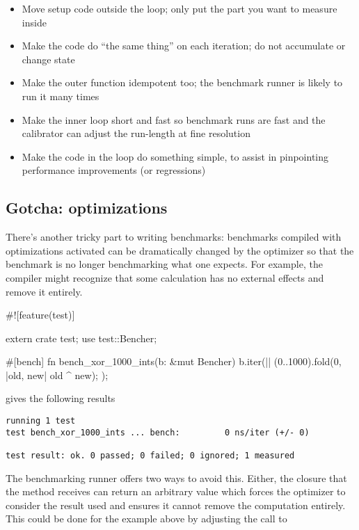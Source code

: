 \begin{itemize}
  \item{Move setup code outside the  loop; only put the part you want to measure inside}
  \item{Make the code do \enquote{the same thing} on each iteration; do not accumulate or change state}
  \item{Make the outer function idempotent too; the benchmark runner is likely to run it many times}
  \item{Make the inner  loop short and fast so benchmark runs are fast and the calibrator can adjust the 
      run-length at fine resolution}
  \item{Make the code in the  loop do something simple, to assist in pinpointing performance improvements 
      (or regressions)}
\end{itemize}

\subsection*{Gotcha: optimizations}

There's another tricky part to writing benchmarks: benchmarks compiled with optimizations activated can be dramatically 
changed by the optimizer so that the benchmark is no longer benchmarking what one expects. For example, the compiler might 
recognize that some calculation has no external effects and remove it entirely.

\begin{rustc}
#![feature(test)]

extern crate test;
use test::Bencher;

#[bench]
fn bench_xor_1000_ints(b: &mut Bencher) {
    b.iter(|| {
        (0..1000).fold(0, |old, new| old ^ new);
    });
}
\end{rustc}

gives the following results

\begin{verbatim}
running 1 test
test bench_xor_1000_ints ... bench:         0 ns/iter (+/- 0)

test result: ok. 0 passed; 0 failed; 0 ignored; 1 measured
\end{verbatim}

The benchmarking runner offers two ways to avoid this. Either, the closure that the  method receives can return 
an arbitrary value which forces the optimizer to consider the result used and ensures it cannot remove the computation entirely. 
This could be done for the example above by adjusting the  call to


